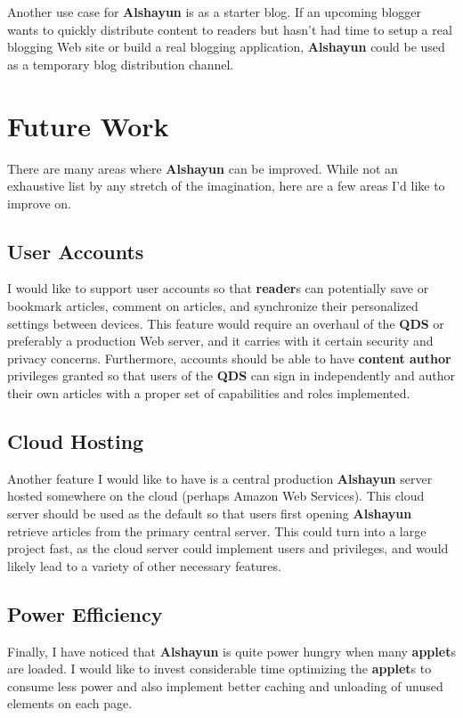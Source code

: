 \documentclass[12pt]{report}
\begin{document}
Another use case for \textbf{Alshayun} is as a starter blog. If an upcoming
blogger wants to quickly distribute content to readers but hasn't had time to
setup a real blogging Web site or build a real blogging application,
\textbf{Alshayun} could be used as a temporary blog distribution channel.

\chapter{Future Work}

There are many areas where \textbf{Alshayun} can be improved. While not an
exhaustive list by any stretch of the imagination, here are a few areas I'd like
to improve on.

    \section{User Accounts}

I would like to support user accounts so that \textbf{reader}s can potentially
save or bookmark articles, comment on articles, and synchronize their
personalized settings between devices. This feature would require an overhaul of
the \textbf{QDS} or preferably a production Web server, and it carries with it
certain security and privacy concerns. Furthermore, accounts should be able to
have \textbf{content author} privileges granted so that users of the
\textbf{QDS} can sign in independently and author their own articles with a
proper set of capabilities and roles implemented.

    \section{Cloud Hosting}

Another feature I would like to have is a central production \textbf{Alshayun}
server hosted somewhere on the cloud (perhaps Amazon Web Services). This cloud
server should be used as the default so that users first opening
\textbf{Alshayun} retrieve articles from the primary central server. This could
turn into a large project fast, as the cloud server could implement users and
privileges, and would likely lead to a variety of other necessary features.

    \section{Power Efficiency}

Finally, I have noticed that \textbf{Alshayun} is quite power hungry when many
\textbf{applet}s are loaded. I would like to invest considerable time optimizing
the \textbf{applet}s to consume less power and also implement better caching and
unloading of unused elements on each page.
\end{document}
